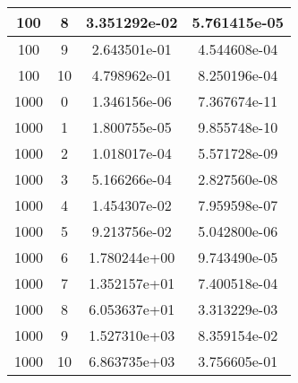 \documentclass[a4paper,12pt]{article}
\begin{document}
\begin{table}[]
\begin{tabular}{|c|c|c|c|}
100  & 8  & 3.351292e-02 & 5.761415e-05 \\ \hline
\rowcolor[HTML]{FFE9F5} 
100  & 9  & 2.643501e-01 & 4.544608e-04 \\ \hline
\rowcolor[HTML]{FFE9F5} 
100  & 10 & 4.798962e-01 & 8.250196e-04 \\ \hline
\rowcolor[HTML]{F1E9FF} 
1000 & 0  & 1.346156e-06 & 7.367674e-11 \\ \hline
\rowcolor[HTML]{F1E9FF} 
1000 & 1  & 1.800755e-05 & 9.855748e-10 \\ \hline
\rowcolor[HTML]{F1E9FF} 
1000 & 2  & 1.018017e-04 & 5.571728e-09 \\ \hline
\rowcolor[HTML]{F1E9FF} 
1000 & 3  & 5.166266e-04 & 2.827560e-08 \\ \hline
\rowcolor[HTML]{F1E9FF} 
1000 & 4  & 1.454307e-02 & 7.959598e-07 \\ \hline
\rowcolor[HTML]{F1E9FF} 
1000 & 5  & 9.213756e-02 & 5.042800e-06 \\ \hline
\rowcolor[HTML]{F1E9FF} 
1000 & 6  & 1.780244e+00 & 9.743490e-05 \\ \hline
\rowcolor[HTML]{F1E9FF} 
1000 & 7  & 1.352157e+01 & 7.400518e-04 \\ \hline
\rowcolor[HTML]{F1E9FF} 
1000 & 8  & 6.053637e+01 & 3.313229e-03 \\ \hline
\rowcolor[HTML]{F1E9FF} 
1000 & 9  & 1.527310e+03 & 8.359154e-02 \\ \hline
\rowcolor[HTML]{F1E9FF} 
1000 & 10 & 6.863735e+03 & 3.756605e-01 \\ \hline
\end{tabular}
\end{table}

\clearpage
\end{document}
